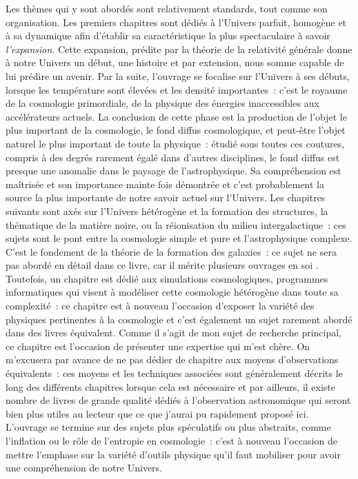 Les thèmes qui y sont abordés sont relativement standards, tout comme son organisation. Les premiers chapitres sont dédiés à l'Univers parfait, homogène et à sa dynamique afin d'établir sa caractéristique la plus spectaculaire à savoir \textit{l'expansion}. Cette expansion, prédite par la théorie de la relativité générale donne à notre Univers un début, une histoire et par extension, nous somme capable de lui prédire un avenir. Par la suite, l'ouvrage se focalise sur l'Univers à ses débuts, lorsque les température sont élevées et les densité importantes~: c'est le royaume de la cosmologie primordiale, de la physique des énergies inaccessibles aux accélérateurs actuels. La conclusion de cette phase est la production de l'objet le plus important de la cosmologie, le fond diffus cosmologique, et peut-être l'objet naturel le plus important de toute la physique~: étudié sous toutes ces coutures, compris à des degrés rarement égalé dans d'autres disciplines, le fond diffus est presque une anomalie dans le paysage de l'astrophysique. Sa compréhension est maîtrisée et son importance mainte fois démontrée et c'est probablement la source la plus importante de notre savoir actuel sur l'Univers. Les chapitres suivants sont axés sur l'Univers hétérogène et la formation des structures, la thématique de la matière noire, ou la réionisation du milieu intergalactique~: ces sujets sont le pont entre la cosmologie simple et pure et l'astrophysique complexe. C'est le fondement de la théorie de la formation des galaxies~: ce sujet ne sera pas abordé en détail dans ce livre, car il mérite plusieurs ouvrages en soi . Toutefois, un chapitre est dédié aux simulations cosmologiques, programmes informatiques qui visent à modéliser cette cosmologie hétérogène dans toute sa complexité~: ce chapitre est à nouveau l'occasion d'exposer la variété des physiques pertinentes à la cosmologie et c'est également un sujet rarement abordé dans des livres équivalent. Comme il s'agit de mon sujet de recherche principal, ce chapitre est l'occasion de présenter une expertise qui m'est chère. On m'excusera par avance de ne pas dédier de chapitre aux moyens d'observations équivalents~: ces moyens et les techniques associées sont généralement décrits le long des différents chapitres lorsque cela est nécessaire et par ailleurs, il existe nombre de livres de grande qualité dédiés à l'observation astronomique qui seront bien plus utiles au lecteur que ce que j'aurai pu rapidement proposé ici. L'ouvrage se termine sur des sujets plus spéculatifs ou plus abstraits, comme l'inflation ou le rôle de l'entropie en cosmologie~: c'est à nouveau l'occasion de mettre l'emphase sur la variété d'outils physique qu'il faut mobiliser pour avoir une compréhension de notre Univers.

